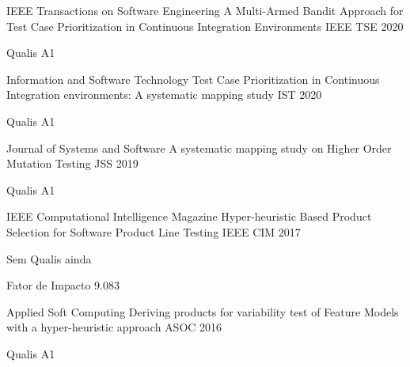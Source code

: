 

\begin{cventries}
				
	\cventry
	{IEEE Transactions on Software Engineering} %
	{A Multi-Armed Bandit Approach for Test Case Prioritization in Continuous Integration Environments} %
	{IEEE TSE} %
	{2020} %
	{
		\begin{cvitems} %
			\item {Qualis A1}
		\end{cvitems}
	}

	\cventry
	{Information and Software Technology} %
	{Test Case Prioritization in Continuous Integration environments: A systematic mapping study} %
	{IST} %
	{2020} %
	{
		\begin{cvitems} %
			\item {Qualis A1}
		\end{cvitems}
	}


	\cventry
	{Journal of Systems and Software} %
	{A systematic mapping study on Higher Order Mutation Testing} %
	{JSS} %
	{2019} %
	{
		\begin{cvitems} %
			\item {Qualis A1}
		\end{cvitems}
	}

	\cventry
	{IEEE Computational Intelligence Magazine} %
	{Hyper-heuristic Based Product Selection for Software Product Line Testing} %
	{IEEE CIM} %
	{2017} %
	{
		\begin{cvitems} %
			\item {Sem Qualis ainda}
			\item {Fator de Impacto 9.083}
		\end{cvitems}
	}


	\cventry
	{Applied Soft Computing} %
	{Deriving products for variability test of Feature Models with a hyper-heuristic approach} %
	{ASOC} %
	{2016} %
	{
		\begin{cvitems} %
			\item {Qualis A1}
		\end{cvitems}
	}
\end{cventries}

